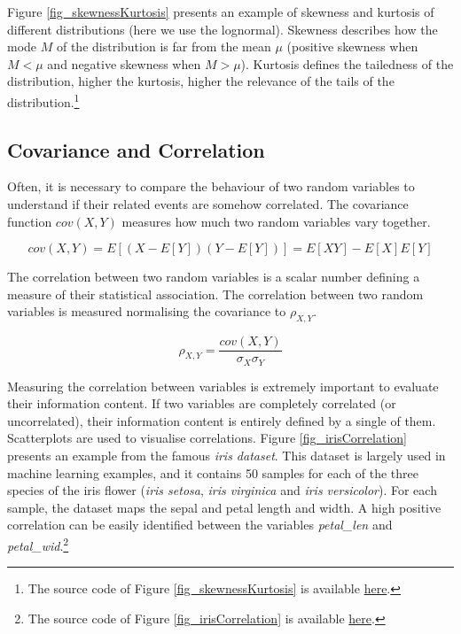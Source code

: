 Figure \ref{fig_skewnessKurtosis} presents an example of skewness and kurtosis of different distributions (here we use the lognormal). Skewness describes how the mode $M$ of the distribution is far from the mean $\mu$ (positive skewness when $M<\mu$ and negative skewness when $M>\mu$). Kurtosis defines the tailedness of the distribution, higher the kurtosis, higher the relevance of the tails of the distribution.\footnote{The source code of Figure \ref{fig_skewnessKurtosis} is available \href{https://github.com/aletuf93/logproj/blob/master/examples/01.\%20Probability\%20Theory.ipynb}{here}.
}

\subsection{Covariance and Correlation} \label{secCovarianceCorrelation}
Often, it is necessary to compare the behaviour of two random variables to understand if their related events are somehow correlated. The covariance function $cov(X,Y)$ measures how much two random variables vary together.

\begin{equation}
cov\left(X,Y\right)=E\left[\left(X-E\left[Y\right]\right)\left(Y-E\left[Y\right]\right)\right]=E\left[XY\right]-E[X]E[Y]
\label{eq_covariance}
\end{equation}

The correlation between two random variables is a scalar number defining a measure of their statistical association. The correlation between two random variables is measured normalising the covariance to $\rho_{X,Y}$.

\begin{equation}
\rho_{X,Y}=\frac{cov(X,Y)}{\sigma_X\sigma_Y}
\label{eq_correlation}
\end{equation}

Measuring the correlation between variables is extremely important to evaluate their information content. If two variables are completely correlated (or uncorrelated), their information content is entirely defined by a single of them. Scatterplots are used to visualise correlations. Figure \ref{fig_irisCorrelation} presents an example from the famous \textit{iris dataset}. This dataset is largely used in machine learning examples, and it contains 50 samples for each of the three species of the iris flower (\textit{iris setosa}, \textit{iris virginica} and \textit{iris versicolor}). For each sample, the dataset maps the sepal and petal length and width. A high positive correlation can be easily identified between the variables \textit{petal\_len} and \textit{petal\_wid}.\footnote{The source code of Figure \ref{fig_irisCorrelation} is available \href{https://github.com/aletuf93/logproj/blob/master/examples/01.\%20Probability\%20Theory.ipynb}{here}.}

